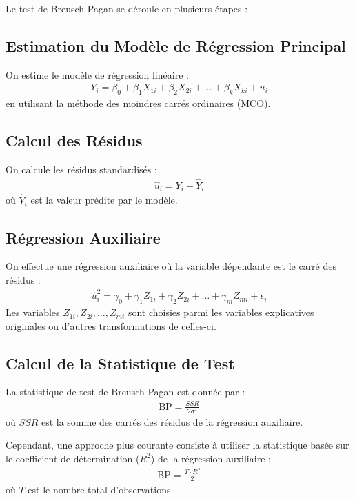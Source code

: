 \documentclass[14pt]{extarticle} %
\theoremstyle{definition}
\theoremstyle{plain}
\begin{document}
Le test de Breusch-Pagan se déroule en plusieurs étapes :

\subsection{Estimation du Modèle de Régression Principal}

On estime le modèle de régression linéaire :
\begin{align*}
    Y_i = \beta_0 + \beta_1 X_{1i} + \beta_2 X_{2i} + \dots + \beta_k X_{ki} + u_i
\end{align*}
en utilisant la méthode des moindres carrés ordinaires (MCO).

\subsection{Calcul des Résidus}

On calcule les résidus standardisés :
\begin{align*}
    \hat{u}_i = Y_i - \hat{Y}_i
\end{align*}
où $\hat{Y}_i$ est la valeur prédite par le modèle.

\subsection{Régression Auxiliaire}

On effectue une régression auxiliaire où la variable dépendante est le carré des résidus :
\begin{align*}
    \hat{u}_i^2 = \gamma_0 + \gamma_1 Z_{1i} + \gamma_2 Z_{2i} + \dots + \gamma_m Z_{mi} + \epsilon_i
\end{align*}
Les variables $Z_{1i}, Z_{2i}, \dots, Z_{mi}$ sont choisies parmi les variables explicatives originales ou d'autres transformations de celles-ci.

\subsection{Calcul de la Statistique de Test}

La statistique de test de Breusch-Pagan est donnée par :
\begin{align*}
    \text{BP} = \frac{SSR}{2\sigma^4}
\end{align*}
où $SSR$ est la somme des carrés des résidus de la régression auxiliaire.

Cependant, une approche plus courante consiste à utiliser la statistique basée sur le coefficient de détermination ($R^2$) de la régression auxiliaire :
\begin{align*}
    \text{BP} = \frac{T \cdot R^2}{2}
\end{align*}
où $T$ est le nombre total d'observations.
\end{document}
